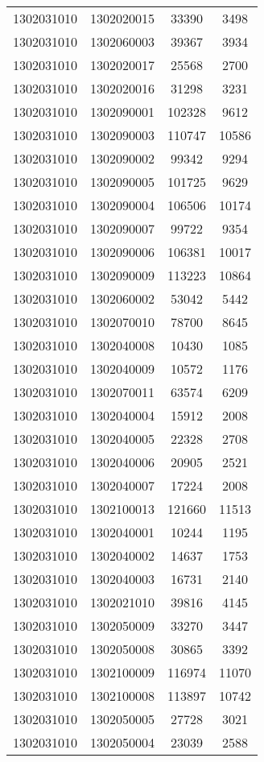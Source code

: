 \begin{longtable}[h]{llcc}
		1302031010 & 1302020015 & 33390 & 3498\\
		1302031010 & 1302060003 & 39367 & 3934\\
		1302031010 & 1302020017 & 25568 & 2700\\
		1302031010 & 1302020016 & 31298 & 3231\\
		1302031010 & 1302090001 & 102328 & 9612\\
		1302031010 & 1302090003 & 110747 & 10586\\
		1302031010 & 1302090002 & 99342 & 9294\\
		1302031010 & 1302090005 & 101725 & 9629\\
		1302031010 & 1302090004 & 106506 & 10174\\
		1302031010 & 1302090007 & 99722 & 9354\\
		1302031010 & 1302090006 & 106381 & 10017\\
		1302031010 & 1302090009 & 113223 & 10864\\
		1302031010 & 1302060002 & 53042 & 5442\\
		1302031010 & 1302070010 & 78700 & 8645\\
		1302031010 & 1302040008 & 10430 & 1085\\
		1302031010 & 1302040009 & 10572 & 1176\\
		1302031010 & 1302070011 & 63574 & 6209\\
		1302031010 & 1302040004 & 15912 & 2008\\
		1302031010 & 1302040005 & 22328 & 2708\\
		1302031010 & 1302040006 & 20905 & 2521\\
		1302031010 & 1302040007 & 17224 & 2008\\
		1302031010 & 1302100013 & 121660 & 11513\\
		1302031010 & 1302040001 & 10244 & 1195\\
		1302031010 & 1302040002 & 14637 & 1753\\
		1302031010 & 1302040003 & 16731 & 2140\\
		1302031010 & 1302021010 & 39816 & 4145\\
		1302031010 & 1302050009 & 33270 & 3447\\
		1302031010 & 1302050008 & 30865 & 3392\\
		1302031010 & 1302100009 & 116974 & 11070\\
		1302031010 & 1302100008 & 113897 & 10742\\
		1302031010 & 1302050005 & 27728 & 3021\\
		1302031010 & 1302050004 & 23039 & 2588\\

\end{longtable}
